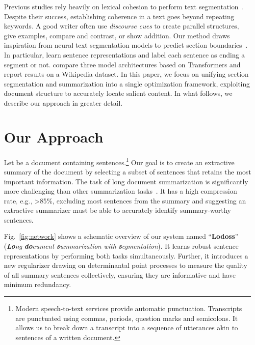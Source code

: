 \documentclass[11pt]{article}
\begin{document}
Previous studies rely heavily on lexical cohesion to perform text segmentation~\citep{hearst-1997-text,passonneau-litman-1997-discourse,malioutov-barzilay-2006-minimum}.
Despite their success, establishing coherence in a text goes beyond repeating keywords.
A good writer often use \emph{discourse cues} to create parallel structures, give examples, compare and contrast, or show addition. Our method draws inspiration from neural text segmentation models to predict section boundaries~\citep{koshorek-etal-2018-text,arnold-etal-2019-sector,xing-etal-2020-improving,lukasik-etal-2020-text}.
In particular, \citet{koshorek-etal-2018-text} learn sentence representations and label each sentence as ending a segment or not.
\citet{lukasik-etal-2020-text} compare three model architectures based on Transformers and report results on a Wikipedia dataset.
In this paper, we focus on unifying section segmentation and summarization into a single optimization framework, 
exploiting document structure to accurately locate salient content.
In what follows, we describe our approach in greater detail.




\section{Our Approach}
\label{sec:approach}



Let  be a document containing  sentences.\footnote{
Modern speech-to-text services provide automatic punctuation.
Transcripts are punctuated using commas, periods, question marks and semicolons. 
It allows us to break down a transcript into a sequence of utterances 
akin to sentences of a written document.
}
Our goal is to create an extractive summary of the document by selecting a subset of  sentences that retains the most important information.
The task of long document summarization is significantly more challenging than other summarization tasks~\cite{daume-iii-marcu-2002-noisy}.
It has a high compression rate, e.g., >85\%,
excluding most sentences from the summary
and suggesting an extractive summarizer must be able to accurately identify summary-worthy sentences.


Fig.~\ref{fig:network} shows a schematic overview of our system named ``\textbf{Lodoss}'' (\textsl{\textbf{Lo}ng} \textsl{\textbf{do}cument} \textsl{\textbf{s}ummarization} \textsl{with} \textsl{\textbf{s}egmentation}).
It learns robust sentence representations by performing both tasks simultaneously.
Further, it introduces a new regularizer drawing on determinantal point processes \cite{cho-etal-2019-multi,DPPAttn:2021} to measure the quality of all summary sentences collectively, ensuring they are informative and have minimum redundancy. 
\end{document}
